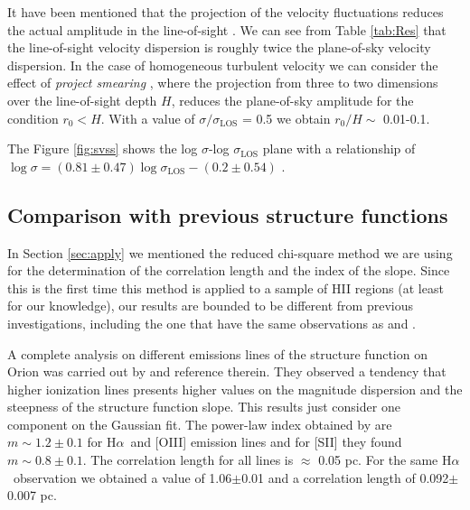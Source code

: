 \documentclass[fleqn,usenatbib, useAMS, a4paper]{mnras}
\newcommand\halpha{H${\alpha}$}
\begin{document}
It have been mentioned that the projection of the velocity fluctuations reduces the actual amplitude in the line-of-sight \citep{1984ApJ...277..556S,arthur2016turbulence}.
We can see from Table \ref{tab:Res} that the line-of-sight velocity dispersion is roughly twice the plane-of-sky velocity dispersion.
In the case of homogeneous turbulent velocity we can consider the effect of \textit{project smearing} \citep{1984ApJ...277..556S}, where the projection from three to two dimensions over the line-of-sight depth \(H\), reduces the plane-of-sky amplitude for the condition \(r_{0} < H\).
With a value of \(\sigma / \sigma_{\text{LOS}}\) = 0.5 we obtain \(r_{0} / H \sim\) 0.01-0.1.

The Figure \ref{fig:svss} shows the log $\sigma$-log $\sigma_{\text{LOS}}$ plane with a relationship of $\log \sigma = (0.81 \pm 0.47) \log \sigma_{\text{LOS}}-(0.2 \pm 0.54)$ .

\subsection{Comparison with previous structure functions}

In Section \ref{sec:apply} we mentioned the reduced chi-square method we are using for the determination of the correlation length and the index of the slope. Since this is the first time this method is applied to a sample of HII regions (at least for our knowledge), our results are bounded to be different from previous investigations, including the one that have the same observations as \citet{arthur2016turbulence} and \citet{2019arXiv191203543M}. 

A complete analysis on different emissions lines of the structure function on Orion was carried out by \citet{arthur2016turbulence} and reference therein. 
They observed a tendency that higher ionization lines presents higher values on the magnitude dispersion and the steepness of the structure function slope. 
This results just consider one component on the Gaussian fit. 
The power-law index obtained by \citet{arthur2016turbulence} are \(m \sim 1.2 \pm 0.1\) for \halpha\ and [OIII] emission lines and for [SII] they found \(m \sim 0.8 \pm 0.1\). 
The correlation length for all lines is \(\approx\) 0.05 pc. For the same \halpha\ observation we obtained a value of 1.06$\pm$0.01 and a correlation length of 0.092$\pm$0.007 pc. 
\end{document}
